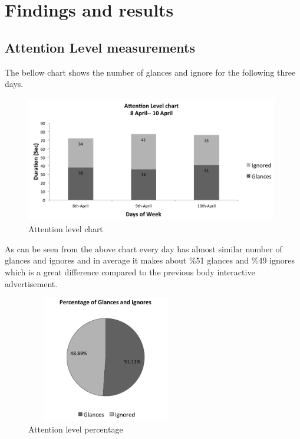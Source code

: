 \newpage
\section{Findings and results}

\subsection{Attention Level measurements}

The bellow chart shows the number of glances and ignore for the following three days.
\begin{figure}[H]
    \centering
    \includegraphics[width=110mm,height=55mm]{Figures/9/newbody_Inter_chart}%
    \caption{Attention level chart}%
    \label{fig:newbodyattentionlevelchart}%
\end{figure}


As can be seen from the above chart every day has almost similar number of glances and ignores and in average it makes about \%51 glances and \%49 ignores which is a great difference compared to the previous body interactive advertisement.


\begin{figure}[H]
    \centering
    \includegraphics[width=70mm,height=55mm]{Figures/9/newbody_inter_percentage}
    \caption{Attention level percentage}%
    \label{fig:Nonattentionlevelpercentage}%
\end{figure}



